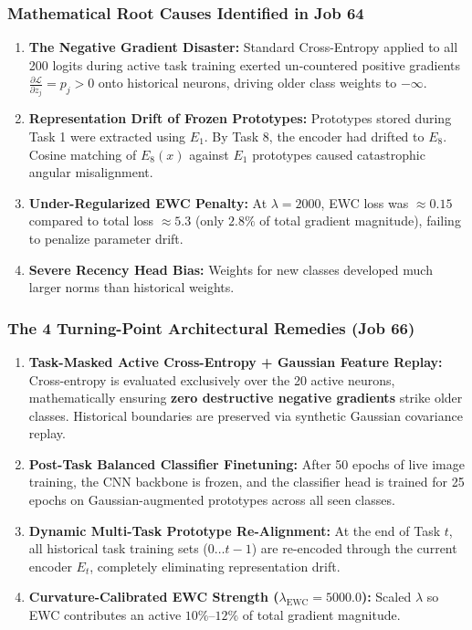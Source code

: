 \documentclass[11pt,a4paper]{article}
\begin{document}
\subsubsection{Mathematical Root Causes Identified in Job 64}
\begin{enumerate}
    \item \textbf{The Negative Gradient Disaster:} Standard Cross-Entropy applied to all 200 logits during active task training exerted un-countered positive gradients $\frac{\partial \mathcal{L}}{\partial z_j} = p_j > 0$ onto historical neurons, driving older class weights to $-\infty$.
    \item \textbf{Representation Drift of Frozen Prototypes:} Prototypes stored during Task 1 were extracted using $E_1$. By Task 8, the encoder had drifted to $E_8$. Cosine matching of $E_8(x)$ against $E_1$ prototypes caused catastrophic angular misalignment.
    \item \textbf{Under-Regularized EWC Penalty:} At $\lambda = 2000$, EWC loss was $\approx 0.15$ compared to total loss $\approx 5.3$ (only $2.8\%$ of total gradient magnitude), failing to penalize parameter drift.
    \item \textbf{Severe Recency Head Bias:} Weights for new classes developed much larger norms than historical weights.
\end{enumerate}

\subsubsection{The 4 Turning-Point Architectural Remedies (Job 66)}
\begin{enumerate}
    \item \textbf{Task-Masked Active Cross-Entropy + Gaussian Feature Replay:} Cross-entropy is evaluated exclusively over the 20 active neurons, mathematically ensuring \textbf{zero destructive negative gradients} strike older classes. Historical boundaries are preserved via synthetic Gaussian covariance replay.
    \item \textbf{Post-Task Balanced Classifier Finetuning:} After 50 epochs of live image training, the CNN backbone is frozen, and the classifier head is trained for 25 epochs on Gaussian-augmented prototypes across all seen classes.
    \item \textbf{Dynamic Multi-Task Prototype Re-Alignment:} At the end of Task $t$, all historical task training sets ($0 \dots t-1$) are re-encoded through the current encoder $E_t$, completely eliminating representation drift.
    \item \textbf{Curvature-Calibrated EWC Strength ($\lambda_{\text{EWC}} = 5000.0$):} Scaled $\lambda$ so EWC contributes an active $10\%$--$12\%$ of total gradient magnitude.
\end{enumerate}
\end{document}
